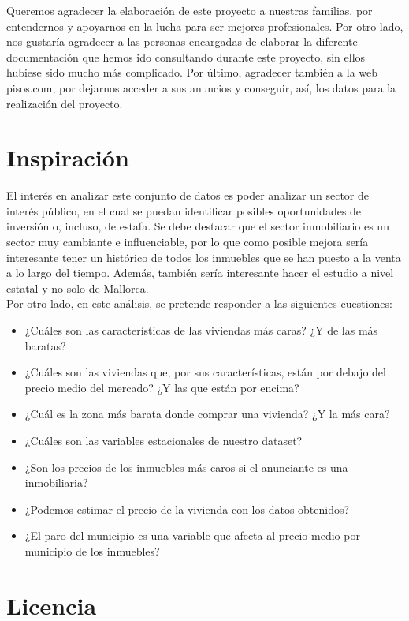 \documentclass[a4paper, 12pt]{article}
\begin{document}
Queremos agradecer la elaboración de este proyecto a nuestras familias, por entendernos y apoyarnos en la lucha para ser mejores profesionales. Por otro lado, nos gustaría agradecer a las personas encargadas de elaborar la diferente documentación que hemos ido consultando durante este proyecto, sin ellos hubiese sido mucho más complicado. Por último, agradecer también a la web pisos.com, por dejarnos acceder a sus anuncios y conseguir, así, los datos para la realización del proyecto.

\section{Inspiración}

El interés en analizar este conjunto de datos es poder analizar un sector de interés público, en el cual se puedan identificar posibles oportunidades de inversión o, incluso, de estafa. Se debe destacar que el sector inmobiliario es un sector muy cambiante e influenciable, por lo que como posible mejora sería interesante tener un histórico de todos los inmuebles que se han puesto a la venta a lo largo del tiempo. Además, también sería interesante hacer el estudio a nivel estatal y no solo de Mallorca.\\
Por otro lado, en este análisis, se pretende responder a las siguientes cuestiones:
\begin{itemize}
\item ¿Cuáles son las características de las viviendas más caras? ¿Y de las más baratas?
\item ¿Cuáles son las viviendas que, por sus características, están por debajo del precio medio del mercado? ¿Y las que están por encima?
\item ¿Cuál es la zona más barata donde comprar una vivienda? ¿Y la más cara?
\item ¿Cuáles son las variables estacionales de nuestro dataset?
\item ¿Son los precios de los inmuebles más caros si el anunciante es una inmobiliaria?
\item ¿Podemos estimar el precio de la vivienda con los datos obtenidos?
\item ¿El paro del municipio es una variable que afecta al precio medio por municipio de los inmuebles?
\end{itemize}

\section{Licencia}
\end{document}

